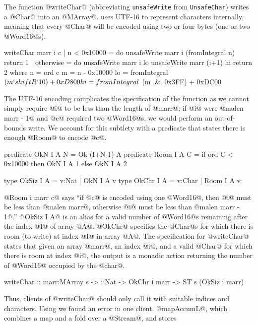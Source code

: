 The function @writeChar@ (abbreviating \texttt{unsafeWrite} from \texttt{UnsafeChar})
writes a @Char@ into an @MArray@.
\libtext uses UTF-16 to represent characters internally,
meaning that every @Char@ will be encoded using two or 
four bytes (one or two @Word16@s).
%
\begin{code}
  writeChar marr i c
      | n < 0x10000 = do
          unsafeWrite marr i (fromIntegral n)
          return 1
      | otherwise = do
          unsafeWrite marr i lo
          unsafeWrite marr (i+1) hi
          return 2
      where n = ord c
            m = n - 0x10000
            lo = fromIntegral
               $ (m `shiftR` 10) + 0xD800
            hi = fromIntegral
               $ (m .&. 0x3FF) + 0xDC00
\end{code}
%
The UTF-16 encoding complicates the specification of the function
as we cannot simply require @i@ to be less than the length of 
@marr@; if @i@ were @malen marr - 1@ and @c@ required two 
@Word16@s, we would perform an out-of-bounds write. 
%
We account for this subtlety with a predicate that states 
there is enough @Room@ to encode @c@.
%
\begin{code}
  predicate OkN I A N  = Ok (I+N-1) A
  predicate Room I A C = if ord C < 0x10000
                         then OkN I A 1
                         else OkN I A 2
  
  type OkSiz I A = {v:Nat  | OkN  I A v}
  type OkChr I A = {v:Char | Room I A v}
\end{code}
%
@Room i marr c@ says 
``if @c@ is encoded using one @Word16@, 
  then @i@ must be less than @malen marr@,
  otherwise @i@ must be less than @malen marr - 1@.''
%
@OkSiz I A@ is an alias for a valid number of @Word16@s 
remaining after the index @I@ of array @A@. 
@OkChr@ specifies the @Char@s for which there is room (to write)
at index @I@ in array @A@.
%
The specification for @writeChar@ states that given an array \hbox{@marr@,}
an index @i@, and a valid @Char@ for which there is room at index \hbox{@i@,}
the output is a monadic action returning the number of @Word16@ occupied
by the @char@.
%
\begin{code}
  writeChar :: marr:MArray s
            -> i:Nat
            -> OkChr i marr
            -> ST s (OkSiz i marr)
\end{code}
%
Thus, clients of @writeChar@ should only call it with suitable indices
and characters.
%
Using \toolname we found an error in one client, @mapAccumL@, 
which combines a map and a fold over a @Stream@, and stores 
